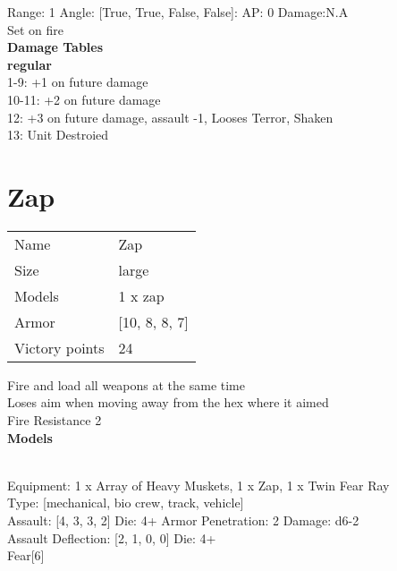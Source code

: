 Range: 1  Angle: [True, True, False, False]: AP: 0 Damage:N.A \\
Set on fire\\ 




 





{\bf Damage Tables} \\
 {\bf regular } \\
1-9: +1 on future damage \\
10-11: +2 on future damage \\
12: +3 on future damage, assault -1, Looses Terror, Shaken \\
13: Unit Destroied \\










\pagebreak\pagebreak

\section{ Zap }

\begin{tabular}{ll}
  Name & Zap \\
  Size & large\\
  Models & 1 x zap\\
  Armor & [10, 8, 8, 7]\\
  Victory points & 24\\
\end{tabular}

Fire and load all weapons at the same time\\ 
Loses aim when moving away from the hex where it aimed\\ 
Fire Resistance 2\\ 


{\bf Models}

 \\
Equipment: 1 x Array of Heavy Muskets, 1 x Zap, 1 x Twin Fear Ray \\
Type: [mechanical, bio crew, track, vehicle] \\

Assault: [4, 3, 3, 2] Die: 4+ Armor Penetration: 2 Damage: d6-2 \\
Assault Deflection: [2, 1, 0, 0] Die: 4+\\
\indent Fear[6]\\ 
 



